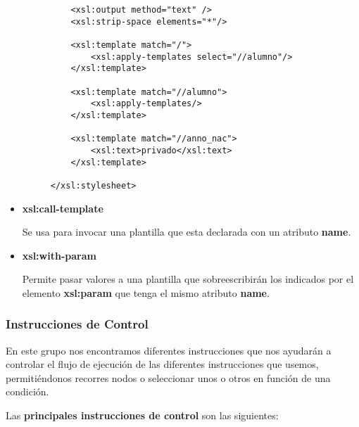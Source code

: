 \begin{itemize}
\begin{figure}[H]
\begin{tcolorbox}[sharp corners, colback=yellow!30, colframe=white!20]
\begin{verbatim}
    <xsl:output method="text" />
    <xsl:strip-space elements="*"/>

    <xsl:template match="/">
        <xsl:apply-templates select="//alumno"/>
    </xsl:template>

    <xsl:template match="//alumno">
        <xsl:apply-templates/>
    </xsl:template>

    <xsl:template match="//anno_nac">
        <xsl:text>privado</xsl:text>
    </xsl:template>

</xsl:stylesheet>
\end{verbatim}
        \end{tcolorbox}
    \end{figure}

    \item \textbf{xsl:call-template}

    Se usa para invocar una plantilla que esta declarada con un atributo \textbf{name}.

    \item \textbf{xsl:with-param}

    Permite pasar valores a una plantilla que sobreescribirán los indicados por el elemento \textbf{xsl:param} que tenga el mismo atributo \textbf{name}.
\end{itemize}

\subsubsection{Instrucciones de Control}
En este grupo nos encontramos diferentes instrucciones que nos ayudarán a controlar el flujo de ejecución de las diferentes instrucciones que usemos, permitiéndonos recorres nodos o seleccionar unos o otros en función de una condición.

Las \textbf{principales instrucciones de control} son las siguientes:

